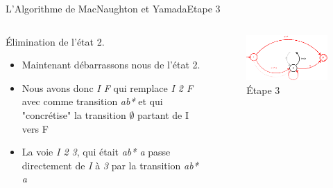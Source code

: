 \documentclass{beamer}
\begin{document}
\begin{frame}{L'Algorithme de MacNaughton et Yamada}{Etape 3}
     \begin{columns}[T]
     \begin{column}{.48\textwidth}
         {\fontsize{8}{9}\selectfont Élimination de l'état 2.}
         \begin{itemize}
         
             \item {\fontsize{7}{8}\selectfont Maintenant débarrassons nous de l'état 2.}
             \item {\fontsize{7}{8}\selectfont Nous avons donc \textit{I F} qui remplace \textit{I 2 F} avec comme transition \textit{ab*} et qui "concrétise" la transition $\emptyset$ partant de I vers F}
             \item {\fontsize{7}{8}\selectfont La voie \textit{I 2 3}, qui était \textit{ab* a} passe directement de \textit{I} à \textit{3} par la transition \textit{ab* a}}
             
         \end{itemize}
     \end{column}
     
     \begin{column}{.48\textwidth}
     \begin{figure}
     \includegraphics[scale=0.37]{Diagramme4_3.png}
     \centering
     \caption{Étape 3}     
     \end{figure}
     \end{column}
        
     \end{columns}
\end{frame}
\end{document}
